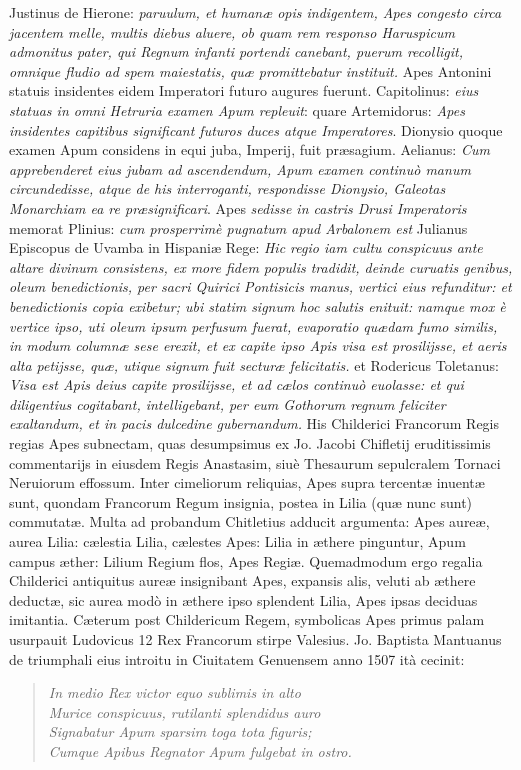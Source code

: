 \documentclass[a4paper, 11pt, oneside, polutonikogreek, latin]{article}
\begin{document}
Justinus de Hierone: \emph{paruulum, et humanæ opis indigentem, Apes congesto circa jacentem melle, multis diebus aluere, ob quam rem responso Haruspicum admonitus pater, qui Regnum infanti portendi canebant, puerum recolligit, omnique fludio ad spem maiestatis, quæ promittebatur instituit.} Apes Antonini statuis insidentes eidem Imperatori futuro augures fuerunt. Capitolinus: \emph{eius statuas in omni Hetruria examen Apum repleuit}: quare Artemidorus: \emph{Apes insidentes capitibus significant futuros duces atque Imperatores}. Dionysio quoque examen Apum considens in equi juba, Imperij, fuit præsagium. Aelianus: \emph{Cum apprebenderet eius jubam ad ascendendum, Apum examen continuò manum circundedisse, atque de his interroganti, respondisse Dionysio, Galeotas Monarchiam ea re præsignificari}. Apes \emph{sedisse in castris Drusi Imperatoris} memorat Plinius: \emph{cum prosperrimè pugnatum apud Arbalonem est} Julianus Episcopus de Uvamba in Hispaniæ Rege: \emph{Hic regio iam cultu conspicuus ante altare divinum consistens, ex more fidem populis tradidit, deinde curuatis genibus, oleum benedictionis, per sacri Quirici Pontisicis manus, vertici eius refunditur: et benedictionis copia exibetur; ubi statim signum hoc salutis enituit: namque mox è vertice ipso, uti oleum ipsum perfusum fuerat, evaporatio quædam fumo similis, in modum columnæ sese erexit, et ex capite ipso Apis visa est prosilijsse, et aeris alta petijsse, quæ, utique signum fuit secturæ felicitatis.} et Rodericus Toletanus: \emph{Visa est Apis deius capite prosilijsse, et ad cælos continuò euolasse: et qui diligentius cogitabant, intelligebant, per eum Gothorum regnum feliciter exaltandum, et in pacis dulcedine gubernandum.} His Childerici Francorum Regis regias Apes subnectam, quas desumpsimus ex Jo. Jacobi Chifletij eruditissimis commentarijs in eiusdem Regis Anastasim, siuè Thesaurum sepulcralem Tornaci Neruiorum effossum. Inter cimeliorum reliquias, Apes supra tercentæ inuentæ sunt, quondam Francorum Regum insignia, postea in Lilia (quæ nunc sunt) commutatæ. Multa ad probandum Chitletius adducit argumenta: Apes aureæ, aurea Lilia: cælestia Lilia, cælestes Apes: Lilia in æthere pinguntur, Apum campus æther: Lilium Regium flos, Apes Regiæ. Quemadmodum ergo regalia Childerici antiquitus aureæ insignibant Apes, expansis alis, veluti ab æthere deductæ, sic aurea modò in æthere ipso splendent Lilia, Apes ipsas deciduas imitantia. Cæterum post Childericum Regem, symbolicas Apes primus palam usurpauit Ludovicus 12 Rex Francorum stirpe Valesius. Jo. Baptista Mantuanus de triumphali eius introitu in Ciuitatem Genuensem anno 1507 ità cecinit:
\begin{quote}
\emph{In medio Rex victor equo sublimis in alto}\\
\emph{Murice conspicuus, rutilanti splendidus auro}\\
\emph{Signabatur Apum sparsim toga tota figuris;}\\
\emph{Cumque Apibus Regnator Apum fulgebat in ostro.}\\
\end{quote}
\end{document}
